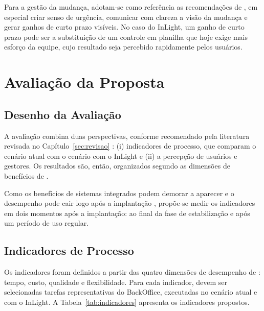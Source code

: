 Para a gestão da mudança, adotam-se como referência as recomendações de \citet{kotter1996}, em especial criar senso de urgência, comunicar com clareza a visão da mudança e gerar ganhos de curto prazo visíveis. No caso do InLight, um ganho de curto prazo pode ser a substituição de um controle em planilha que hoje exige mais esforço da equipe, cujo resultado seja percebido rapidamente pelos usuários.

\section{Avaliação da Proposta}
\label{sec:avaliacao}

\subsection{Desenho da Avaliação}

A avaliação combina duas perspectivas, conforme recomendado pela literatura revisada no Capítulo~\ref{sec:revisao} \citep{petter2008,wixom2005}: (i) indicadores de processo, que comparam o cenário atual com o cenário com o InLight e (ii) a percepção de usuários e gestores. Os resultados são, então, organizados segundo as dimensões de benefícios de \citet{shang2002}.

Como os benefícios de sistemas integrados podem demorar a aparecer e o desempenho pode cair logo após a implantação \citep{hitt2002,tong2015}, propõe-se medir os indicadores em dois momentos após a implantação: ao final da fase de estabilização e após um período de uso regular.

\subsection{Indicadores de Processo}

Os indicadores foram definidos a partir das quatro dimensões de desempenho de \citet{dumas2018}: tempo, custo, qualidade e flexibilidade. Para cada indicador, devem ser selecionadas tarefas representativas do BackOffice, executadas no cenário atual e com o InLight. A Tabela~\ref{tab:indicadores} apresenta os indicadores propostos.

